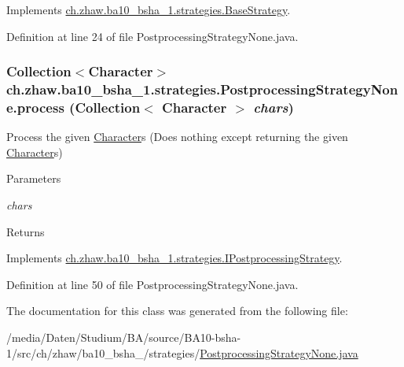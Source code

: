 Implements \hyperlink{classch_1_1zhaw_1_1ba10__bsha__1_1_1strategies_1_1BaseStrategy_af6ea27835befac71906915236a347450}{ch.zhaw.ba10\_\-bsha\_\-1.strategies.BaseStrategy}.

Definition at line 24 of file PostprocessingStrategyNone.java.\hypertarget{classch_1_1zhaw_1_1ba10__bsha__1_1_1strategies_1_1PostprocessingStrategyNone_af9183ec4f0802402cde7f97f746c7874}{
\subsubsection[{process}]{\setlength{\rightskip}{0pt plus 5cm}Collection$<${\bf Character}$>$ ch.zhaw.ba10\_\-bsha\_\-1.strategies.PostprocessingStrategyNone.process (Collection$<$ {\bf Character} $>$ {\em chars})}}
\label{classch_1_1zhaw_1_1ba10__bsha__1_1_1strategies_1_1PostprocessingStrategyNone_af9183ec4f0802402cde7f97f746c7874}
Process the given \hyperlink{classch_1_1zhaw_1_1ba10__bsha__1_1_1Character}{Character}s (Does nothing except returning the given \hyperlink{classch_1_1zhaw_1_1ba10__bsha__1_1_1Character}{Character}s)


\begin{DoxyParams}{Parameters}
\item[{\em chars}]\end{DoxyParams}
\begin{DoxyReturn}{Returns}

\end{DoxyReturn}


Implements \hyperlink{interfacech_1_1zhaw_1_1ba10__bsha__1_1_1strategies_1_1IPostprocessingStrategy_a0bb435d4c5cb8ce3b3909ad81961d912}{ch.zhaw.ba10\_\-bsha\_\-1.strategies.IPostprocessingStrategy}.

Definition at line 50 of file PostprocessingStrategyNone.java.

The documentation for this class was generated from the following file:\begin{DoxyCompactItemize}
\item 
/media/Daten/Studium/BA/source/BA10-\/bsha-\/1/src/ch/zhaw/ba10\_\-bsha\_/strategies/\hyperlink{PostprocessingStrategyNone_8java}{PostprocessingStrategyNone.java}\end{DoxyCompactItemize}
